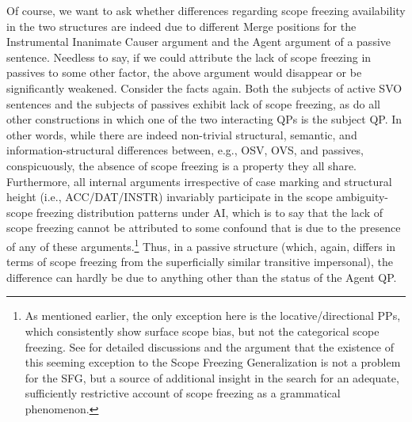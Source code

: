\documentclass[output=paper,colorlinks,citecolor=brown]{langscibook}
\begin{document}
\noindent Of course, we want to ask whether differences regarding scope freezing availability in the two structures are indeed due to different Merge positions for the Instrumental Inanimate Causer argument and the Agent argument of a passive sentence. Needless to say, if we could attribute the lack of scope freezing in passives to some other factor, the above argument would disappear or be significantly weakened. Consider the facts again. Both the subjects of active SVO sentences and the subjects of passives exhibit lack of scope freezing, as do all other constructions in which one of the two interacting QPs is the subject QP. In other words, while there are indeed non-trivial structural, semantic, and information-structural differences between, e.g., OSV, OVS, and passives, conspicuously, the absence of scope freezing is a property they all share. Furthermore, all internal arguments irrespective of case marking and structural height (i.e., ACC/DAT/INSTR) invariably participate in the scope ambiguity-scope freezing distribution patterns under AI, which is to say that the lack of scope freezing cannot be attributed to some confound that is due to the presence of any of these arguments.\footnote{\textrm{As mentioned earlier, the only exception here is the locative/directional PPs, which consistently show surface scope bias, but not the categorical scope freezing. See \citet{Antonyuk2020, AntonyukUnderReview} for detailed discussions and the argument that the existence of this seeming exception to the Scope Freezing Generalization is not a problem for the SFG, but a source of additional insight in the search for an adequate, sufficiently restrictive account of scope freezing as a grammatical phenomenon.}} Thus, in a passive structure (which, again, differs in terms of scope freezing from the superficially similar transitive impersonal), the difference can hardly be due to anything other than the status of the Agent QP.
\end{document}
